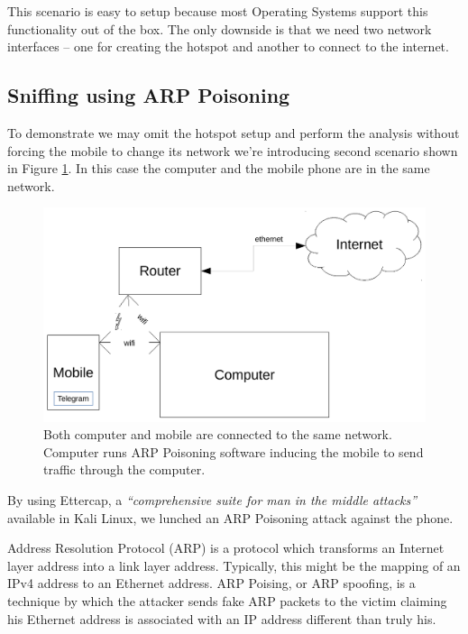 \documentclass[thesis=M,english]{FITthesis}[2012/10/20]
\begin{document}
This scenario is easy to setup because most Operating Systems support this functionality out of the box. The only downside is that we need two network interfaces -- one for creating the hotspot and another to connect to the internet.


\subsection{Sniffing using ARP Poisoning}

To demonstrate we may omit the hotspot setup and perform the analysis without forcing the mobile to change its network we're introducing second scenario shown in Figure \ref{img:analysis-setup-arp}. In this case the computer and the mobile phone are in the same network.

\begin{figure}[htb]
	\centering
	\includegraphics[width=1\textwidth]{setup-arp.pdf}
	\caption{Both computer and mobile are connected to the same network. Computer runs ARP Poisoning software inducing the mobile to send traffic through the computer.}
	\label{img:analysis-setup-arp}
\end{figure}


By using Ettercap, a \emph{``comprehensive suite for man in the middle attacks''} \cite{ettercap-homepage} available in Kali Linux, we lunched an ARP Poisoning attack against the phone.

Address Resolution Protocol (ARP) is a protocol which transforms an Internet layer address into a link layer address. Typically, this might be the mapping of an IPv4 address to an Ethernet address. ARP Poising, or ARP spoofing, is a technique by which the attacker sends fake ARP packets to the victim claiming his Ethernet address is associated with an IP address different than truly his.
\end{document}
